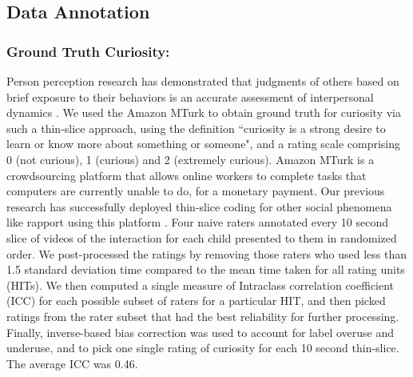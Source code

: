 \documentclass{llncs}
\begin{document}
\subsection{Data Annotation}
\vspace{-0.25cm}
\subsubsection{Ground Truth Curiosity:}
Person perception research has demonstrated that judgments of others based on brief exposure to their behaviors is an accurate assessment of interpersonal dynamics \cite{ambady1992thin}. We used the Amazon MTurk to obtain ground truth for curiosity via such a thin-slice approach, using the definition ``curiosity is a strong desire to learn or know more about something or someone", and a rating scale comprising 0 (not curious), 1 (curious) and 2 (extremely curious). Amazon MTurk is a crowdsourcing platform that allows online workers to complete tasks that computers are currently unable to do, for a monetary payment. Our previous research has successfully deployed thin-slice coding for other social phenomena like rapport using this platform \cite{sinha2015we}. Four naive raters annotated every 10 second slice of videos of the interaction for each child presented to them in randomized order. We post-processed the ratings by removing those raters who used less than 1.5 standard deviation time compared to the mean time taken for all rating units (HITs). We then computed a single measure of Intraclass correlation coefficient (ICC) for each possible subset of raters for a particular HIT, and then picked ratings from the rater subset that had the best reliability for further processing. Finally, inverse-based bias correction \cite{kruger2014axiomatic} was used to account for label overuse and underuse, and to pick one single rating of curiosity for each 10 second thin-slice. The average ICC was 0.46.
\vspace{-0.15cm}
\end{document}
